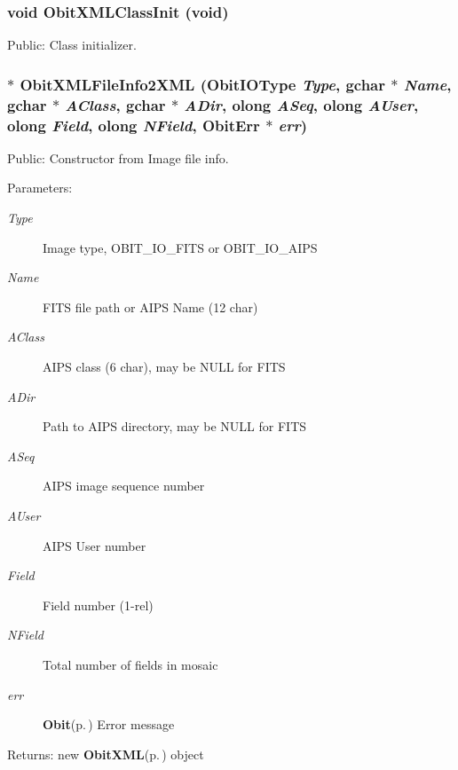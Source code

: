 \subsubsection{\setlength{\rightskip}{0pt plus 5cm}void Obit\-XMLClass\-Init (void)}\label{ObitXML_8h_a14}


Public: Class initializer. 

\subsubsection{$\ast$ Obit\-XMLFile\-Info2XML (Obit\-IOType {\em Type}, gchar $\ast$ {\em Name}, gchar $\ast$ {\em AClass}, gchar $\ast$ {\em ADir}, {\bf olong} {\em ASeq}, {\bf olong} {\em AUser}, {\bf olong} {\em Field}, {\bf olong} {\em NField}, {\bf Obit\-Err} $\ast$ {\em err})}\label{ObitXML_8h_a26}


Public: Constructor from Image file info. 

\begin{Desc}
\item[Parameters:]
\begin{description}
\item[{\em Type}]Image type, OBIT\_\-IO\_\-FITS or OBIT\_\-IO\_\-AIPS \item[{\em Name}]FITS file path or AIPS Name (12 char) \item[{\em AClass}]AIPS class (6 char), may be NULL for FITS \item[{\em ADir}]Path to AIPS directory, may be NULL for FITS \item[{\em ASeq}]AIPS image sequence number \item[{\em AUser}]AIPS User number \item[{\em Field}]Field number (1-rel) \item[{\em NField}]Total number of fields in mosaic \item[{\em err}]{\bf Obit}{\rm (p.\,\pageref{structObit})} Error message \end{description}
\end{Desc}
\begin{Desc}
\item[Returns:]new {\bf Obit\-XML}{\rm (p.\,\pageref{structObitXML})} object \end{Desc}

